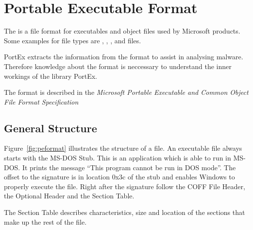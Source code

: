 \chapter{Portable Executable Format} \label{chap:peformat}

The \PE{} is a file format for executables and object files used by Microsoft products. Some examples for \PE{} file types are \DLL{}, \FON{}, \DRV{}, \SYS{} and \EXE{} files.

PortEx extracts the information from the \PE{} format to assist in analysing malware. Therefore knowledge about the \PE{} format is neccessary to understand the inner workings of the library PortEx.

The \PE{} format is described in the \emph{Microsoft Portable Executable and Common Object File Format Specification} \cite{pespec}

\section{General Structure}

Figure~\ref{fig:peformat} illustrates the structure of a \PE{} file. An executable \PE{} file always starts with the MS-DOS Stub. This is an application which is able to run in MS-DOS. It prints the message \enquote{This program cannot be run in DOS mode}. The offset to the \PE{} signature is in location 0x3c of the stub and enables Windows to properly execute the \PE{} file. Right after the signature follow the COFF File Header, the Optional Header and the Section Table.

The Section Table describes \ia{} characteristics, size and location of the sections that make up the rest of the \PE{} file.

